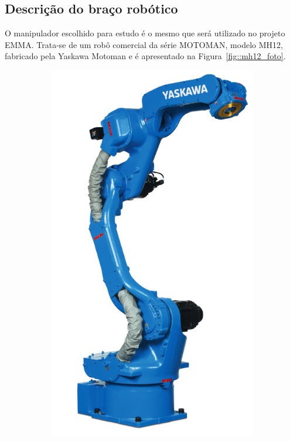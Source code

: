 \subsection{Descrição do braço robótico} \label{sec::descricao_mh12}

O manipulador escolhido para estudo é o mesmo que será utilizado no projeto
EMMA. Trata-se de um robô comercial da série MOTOMAN, modelo MH12, fabricado
pela Yaskawa Motoman e é apresentado na Figura~\ref{fig::mh12_foto}.

\begin{figure}[h]
    \centering
    \begin{subfigure}[b]{0.3\textwidth}
        \includegraphics[width=\textwidth]{figs/mh12_foto}

\end{subfigure}
\end{figure}
